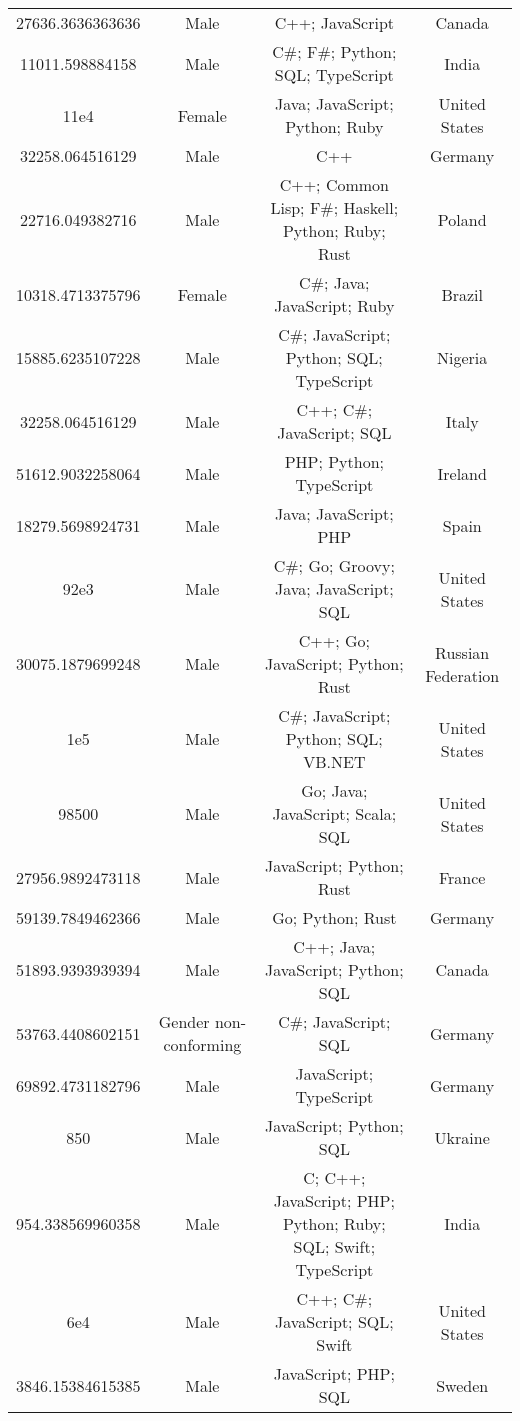 \begin{center}
\begin{tabular}{ |c|c|c|c| }
27636.3636363636  &  Male  &  C++; JavaScript  &  Canada  \\ 
11011.598884158  &  Male  &  C\#; F\#; Python; SQL; TypeScript  &  India  \\ 
11e4  &  Female  &  Java; JavaScript; Python; Ruby  &  United States  \\ 
32258.064516129  &  Male  &  C++  &  Germany  \\ 
22716.049382716  &  Male  &  C++; Common Lisp; F\#; Haskell; Python; Ruby; Rust  &  Poland  \\ 
10318.4713375796  &  Female  &  C\#; Java; JavaScript; Ruby  &  Brazil  \\ 
15885.6235107228  &  Male  &  C\#; JavaScript; Python; SQL; TypeScript  &  Nigeria  \\ 
32258.064516129  &  Male  &  C++; C\#; JavaScript; SQL  &  Italy  \\ 
51612.9032258064  &  Male  &  PHP; Python; TypeScript  &  Ireland  \\ 
18279.5698924731  &  Male  &  Java; JavaScript; PHP  &  Spain  \\ 
92e3  &  Male  &  C\#; Go; Groovy; Java; JavaScript; SQL  &  United States  \\ 
30075.1879699248  &  Male  &  C++; Go; JavaScript; Python; Rust  &  Russian Federation  \\ 
1e5  &  Male  &  C\#; JavaScript; Python; SQL; VB.NET  &  United States  \\ 
98500  &  Male  &  Go; Java; JavaScript; Scala; SQL  &  United States  \\ 
27956.9892473118  &  Male  &  JavaScript; Python; Rust  &  France  \\ 
59139.7849462366  &  Male  &  Go; Python; Rust  &  Germany  \\ 
51893.9393939394  &  Male  &  C++; Java; JavaScript; Python; SQL  &  Canada  \\ 
53763.4408602151  &  Gender non-conforming  &  C\#; JavaScript; SQL  &  Germany  \\ 
69892.4731182796  &  Male  &  JavaScript; TypeScript  &  Germany  \\ 
850  &  Male  &  JavaScript; Python; SQL  &  Ukraine  \\ 
954.338569960358  &  Male  &  C; C++; JavaScript; PHP; Python; Ruby; SQL; Swift; TypeScript  &  India  \\ 
6e4  &  Male  &  C++; C\#; JavaScript; SQL; Swift  &  United States  \\ 
3846.15384615385  &  Male  &  JavaScript; PHP; SQL  &  Sweden  \\ 

\end{tabular}
\end{center}
